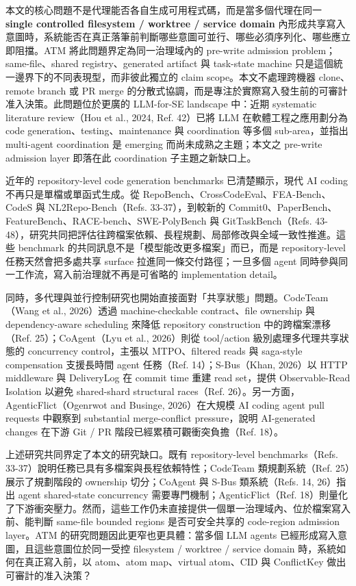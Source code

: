 \documentclass[a4paper,fontset=none]{ctexart}
\begin{document}
本文的核心問題不是代理能否各自生成可用程式碼，而是當多個代理在同一 \textbf{single controlled filesystem / worktree / service domain} 內形成共享寫入意圖時，系統能否在真正落筆前判斷哪些意圖可並行、哪些必須序列化、哪些應立即阻擋。ATM 將此問題界定為同一治理域內的 pre-write admission problem；same-file、shared registry、generated artifact 與 task-state machine 只是這個統一邊界下的不同表現型，而非彼此獨立的 claim scope。本文不處理跨機器 clone、remote branch 或 PR merge 的分散式協調，而是專注於實際寫入發生前的可審計准入決策。此問題位於更廣的 LLM-for-SE landscape 中：近期 systematic literature review（Hou et al., 2024, Ref. 42）已將 LLM 在軟體工程之應用劃分為 code generation、testing、maintenance 與 coordination 等多個 sub-area，並指出 multi-agent coordination 是 emerging 而尚未成熟之主題；本文之 pre-write admission layer 即落在此 coordination 子主題之新缺口上。

近年的 repository-level code generation benchmarks 已清楚顯示，現代 AI coding 不再只是單檔或單函式生成。從 RepoBench、CrossCodeEval、FEA-Bench、CodeS 與 NL2Repo-Bench（Refs. 33-37），到較新的 Commit0、PaperBench、FeatureBench、RACE-bench、SWE-PolyBench 與 GitTaskBench（Refs. 43-48），研究共同把評估往跨檔案依賴、長程規劃、局部修改與全域一致性推進。這些 benchmark 的共同訊息不是「模型能改更多檔案」而已，而是 repository-level 任務天然會把多處共享 surface 拉進同一條交付路徑；一旦多個 agent 同時參與同一工作流，寫入前治理就不再是可省略的 implementation detail。

同時，多代理與並行控制研究也開始直接面對「共享狀態」問題。CodeTeam（Wang et al., 2026）透過 machine-checkable contract、file ownership 與 dependency-aware scheduling 來降低 repository construction 中的跨檔案漂移（Ref. 25）；CoAgent（Lyu et al., 2026）則從 tool/action 級別處理多代理共享狀態的 concurrency control，主張以 MTPO、filtered reads 與 saga-style compensation 支援長時間 agent 任務（Ref. 14）；S-Bus（Khan, 2026）以 HTTP middleware 與 DeliveryLog 在 commit time 重建 read set，提供 Observable-Read Isolation 以避免 shared-shard structural races（Ref. 26）。另一方面，AgenticFlict（Ogenrwot and Businge, 2026）在大規模 AI coding agent pull requests 中觀察到 substantial merge-conflict pressure，說明 AI-generated changes 在下游 Git / PR 階段已經累積可觀衝突負擔（Ref. 18）。

上述研究共同界定了本文的研究缺口。既有 repository-level benchmarks（Refs. 33-37）說明任務已具有多檔案與長程依賴特性；CodeTeam 類規劃系統（Ref. 25）展示了規劃階段的 ownership 切分；CoAgent 與 S-Bus 類系統（Refs. 14, 26）指出 agent shared-state concurrency 需要專門機制；AgenticFlict（Ref. 18）則量化了下游衝突壓力。然而，這些工作仍未直接提供一個單一治理域內、位於檔案寫入前、能判斷 same-file bounded regions 是否可安全共享的 code-region admission layer。ATM 的研究問題因此更窄也更具體：當多個 LLM agents 已經形成寫入意圖，且這些意圖位於同一受控 filesystem / worktree / service domain 時，系統如何在真正寫入前，以 atom、atom map、virtual atom、CID 與 ConflictKey 做出可審計的准入決策？
\end{document}
